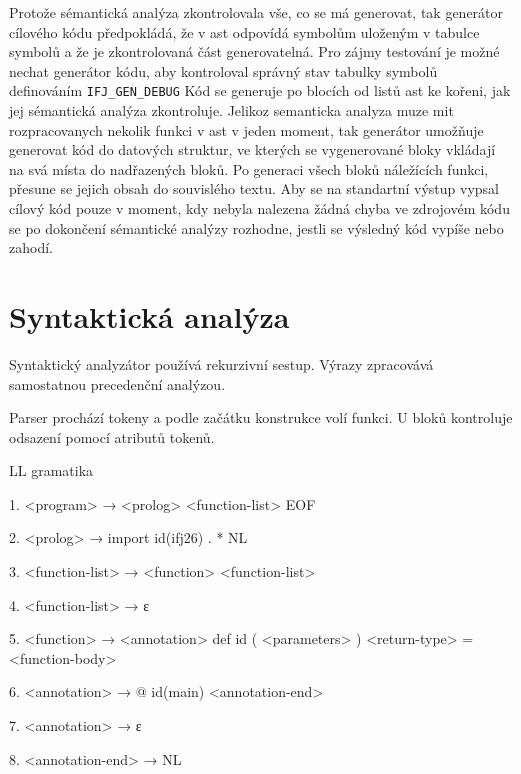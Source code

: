 \documentclass{article}
\begin{document}
Protože sémantická analýza zkontrolovala vše, co se má generovat, tak generátor cílového kódu předpokládá, že v ast odpovídá symbolům uloženým v tabulce symbolů a že je zkontrolovaná část generovatelná.
Pro zájmy testování je možné nechat generátor kódu, aby kontroloval správný stav tabulky symbolů definováním \texttt{IFJ\_GEN\_DEBUG}
Kód se generuje po blocích od listů ast ke kořeni, jak jej sémantická analýza zkontroluje.
Jelikoz semanticka analyza muze mit rozpracovanych nekolik funkci v ast v jeden moment, tak generátor umožňuje generovat kód do datových struktur, ve kterých se vygenerované bloky vkládají na svá místa do nadřazených bloků.
Po generaci všech bloků náležících funkci, přesune se jejich obsah do souvislého textu.
Aby se na standartní výstup vypsal cílový kód pouze v moment, kdy nebyla nalezena žádná chyba ve zdrojovém kódu se po dokončení sémantické analýzy rozhodne, jestli se výsledný kód vypíše nebo zahodí.

\newpage
\section{Syntaktická analýza}

Syntaktický analyzátor používá rekurzivní sestup. Výrazy zpracovává samostatnou precedenční analýzou.

Parser prochází tokeny a podle začátku konstrukce volí funkci. U bloků kontroluje odsazení pomocí atributů tokenů.

LL gramatika

1. \textless program\textgreater{} → \textless prolog\textgreater{} \textless function-list\textgreater{} EOF

2. \textless prolog\textgreater{} → import id(ifj26) . * NL

3. \textless function-list\textgreater{} → \textless function\textgreater{} \textless function-list\textgreater{}

4. \textless function-list\textgreater{} → ε

5. \textless function\textgreater{} → \textless annotation\textgreater{} def id ( \textless parameters\textgreater{} ) \textless return-type\textgreater{} = \textless function-body\textgreater{}

6. \textless annotation\textgreater{} → @ id(main) \textless annotation-end\textgreater{}

7. \textless annotation\textgreater{} → ε

8. \textless annotation-end\textgreater{} → NL
\end{document}
